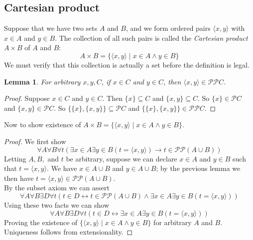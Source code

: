 \documentclass{report}
\newtheorem{lemma}[theo]{Lemma}
\begin{document}
\subsection{Cartesian product}
Suppose that we have two sets $A$ and $B$, and we form ordered pairs $\langle x,y\rangle$ with $x\in A$ and $y\in B$. The collection of all such pairs is called the \textit{Cartesian product}
$A\times B$ of $A$ and $B$:
\begin{equation*}
A\times B=\{\langle x,y\rangle\mid x\in A\land y\in B\}
\end{equation*}
We must verify that this collection is actually a set before the definition is legal.
\begin{lemma}
For arbitrary $x,y,C$, if $x\in C$ and $y\in C$, then $\langle x,y\rangle\in\mathscr P\mathscr PC$.
\end{lemma}
\begin{proof}
Suppose $x\in C$ and $y\in C$. Then $\{x\}\subseteq C$ and $\{x,y\}\subseteq C$. So $\{x\}\in\mathscr PC$ and $\{x,y\}\in\mathscr PC$. So $\{\{x\},\{x,y\}\}\subseteq\mathscr PC$ and 
$\{\{x\},\{x,y\}\}\in\mathscr{PP}C$.
\end{proof}
\noindent Now to show existence of $A\times B=\{\langle x,y\rangle\mid x\in A\land y\in B\}$.
\begin{proof}
We first show
\begin{equation*}
\forall A\forall B\forall t(\exists x\in A\exists y\in B(t=\langle x,y\rangle)\to t\in\mathscr{PP}(A\cup B))
\end{equation*}
Letting $A,B,$ and $t$ be arbitrary, suppose we can declare $x\in A$ and $y\in B$ such that $t=\langle x,y\rangle$. We have $x\in A\cup B$ and $y\in A\cup B$; by the previous lemma we then
have $t=\langle x,y\rangle\in\mathscr{PP}(A\cup B)$.\\
\indent By the subset axiom we can assert
\begin{equation*}
\forall A\forall B\exists D\forall t(t\in D\leftrightarrow t\in\mathscr{PP}(A\cup B)\land\exists x\in A\exists y\in B(t=\langle x,y\rangle))
\end{equation*}
Using these two facts we can show
\begin{equation*}
\forall A\forall B\exists D\forall t(t\in D\leftrightarrow\exists x\in A\exists y\in B(t=\langle x,y\rangle))
\end{equation*}
Proving the existence of $\{\langle x,y\rangle\mid x\in A\land y\in B\}$ for arbitrary $A$ and $B$. Uniqueness follows from extensionality.
\end{proof}
\newpage
\end{document}
